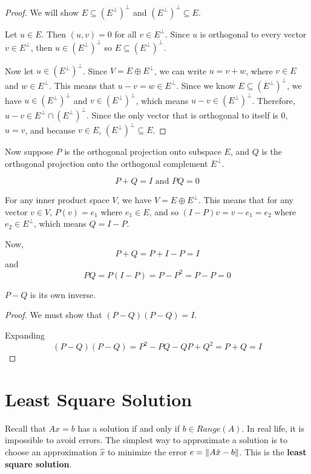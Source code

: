 \begin{proof}
We will show $E \subseteq (E^{\perp})^{\perp}$ and $(E^{\perp})^{\perp} \subseteq E$.

Let $u \in E$. Then $(u, v) = 0$ for all $v \in E^{\perp}$. Since $u$ is orthogonal to every vector $v \in E^{\perp}$, then $u \in (E^{\perp})^{\perp}$ so $E \subseteq (E^{\perp})^{\perp}$. 

Now let $u \in (E^{\perp})^{\perp}$. Since $V = E \oplus E^{\perp}$, we can write $u = v + w$, where $v \in E$ and $w \in E^{\perp}$. This means that $u - v = w \in E^{\perp}$. Since we know $E \subseteq (E^{\perp})^{\perp}$, we have $u \in  (E^{\perp})^{\perp}$ and $v \in (E^{\perp})^{\perp}$, which means $u - v \in  (E^{\perp})^{\perp}$. Therefore, $u - v \in E^{\perp} \cap (E^{\perp})^{\perp}$. Since the only vector that is orthogonal to itself is 0, $u = v$, and because $v \in E$, $(E^{\perp})^{\perp} \subseteq E$. 
\end{proof}

Now suppose $P$ is the orthogonal projection onto subspace $E$, and $Q$ is the orthogonal projection onto the orthogonal complement $E^{\perp}$. 

\begin{lemma}
$$ P + Q = I \text{ and } PQ = 0$$ 
\end{lemma}

\begin{lproof}
For any inner product space $V$, we have $V = E \oplus E^{\perp}$. This means that for any vector $v \in V$, $P(v) = e_{1}$ where $e_{1} \in E$, and so $(I - P)v = v - e_{1} = e_{2}$ where $e_{2} \in E^{\perp}$, which means $Q = I - P$. 

Now, $$P + Q = P + I - P = I$$
and $$PQ = P(I - P) = P - P^{2} = P - P = 0$$
\end{lproof}

\begin{theorem}
$P - Q$ is its own inverse. 
\end{theorem}

\begin{proof}
We must show that $(P-Q)(P-Q) = I$. 

Expanding
$$(P-Q)(P-Q) = P^{2} - PQ - QP + Q^{2} = P + Q = I$$
\end{proof}


\section{Least Square Solution} 
Recall that $Ax = b$ has a solution if and only if $b \in Range(A)$. In real life, it is impossible to avoid errors. The simplest way to approximate a solution is to choose an approximation $\hat{x}$ to minimize the error $e = \norm{A \hat{x} - b}$. This is the \textbf{least square solution}. 

